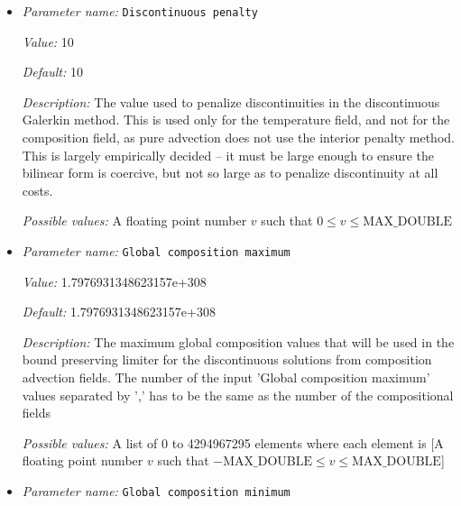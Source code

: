 \begin{itemize}
\item {\it Parameter name:} {\tt Discontinuous penalty}
\label{parameters:Discretization/Stabilization parameters/Discontinuous penalty}
\label{parameters:Discretization/Stabilization_20parameters/Discontinuous_20penalty}


{\it Value:} 10


{\it Default:} 10


{\it Description:} The value used to penalize discontinuities in the discontinuous Galerkin method. This is used only for the temperature field, and not for the composition field, as pure advection does not use the interior penalty method. This is largely empirically decided -- it must be large enough to ensure the bilinear form is coercive, but not so large as to penalize discontinuity at all costs.


{\it Possible values:} A floating point number $v$ such that $0 \leq v \leq \text{MAX\_DOUBLE}$
\item {\it Parameter name:} {\tt Global composition maximum}
\label{parameters:Discretization/Stabilization parameters/Global composition maximum}
\label{parameters:Discretization/Stabilization_20parameters/Global_20composition_20maximum}


{\it Value:} 1.7976931348623157e+308


{\it Default:} 1.7976931348623157e+308


{\it Description:} The maximum global composition values that will be used in the bound preserving limiter for the discontinuous solutions from composition advection fields. The number of the input 'Global composition maximum' values separated by ',' has to be the same as the number of the compositional fields


{\it Possible values:} A list of 0 to 4294967295 elements where each element is [A floating point number $v$ such that $-\text{MAX\_DOUBLE} \leq v \leq \text{MAX\_DOUBLE}$]
\item {\it Parameter name:} {\tt Global composition minimum}
\label{parameters:Discretization/Stabilization parameters/Global composition minimum}
\label{parameters:Discretization/Stabilization_20parameters/Global_20composition_20minimum}



\end{itemize}
